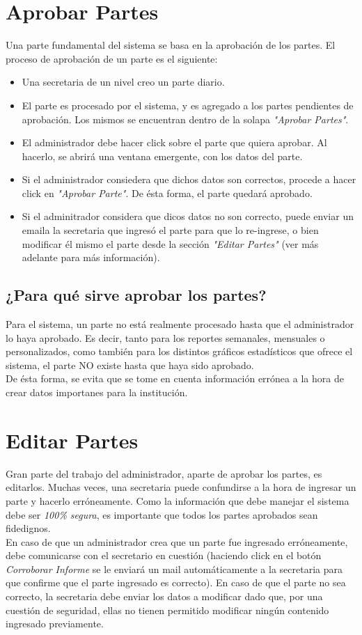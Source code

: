 \documentclass[12pt,a4paper]{article}
\begin{document}
\section{Aprobar Partes}
Una parte fundamental del sistema se basa en la aprobación de los partes. El proceso de aprobación de un parte es el siguiente:
\begin{itemize}
	\item Una secretaria de un nivel creo un parte diario.
	\item El parte es procesado por el sistema, y es agregado a los partes pendientes de aprobación. Los mismos se encuentran dentro de la solapa \textit{"Aprobar Partes"}. 
	\item El administrador debe hacer click sobre el parte que quiera aprobar. Al hacerlo, se abrirá una ventana emergente, con los datos del parte.
	\item Si el administrador consiedera que dichos datos son correctos, procede a hacer click en \textit{"Aprobar Parte"}. De ésta forma, el parte quedará aprobado.
	\item Si el adminitrador considera que dicos datos no son correcto, puede enviar un emaila la secretaria que ingresó el parte para que lo re-ingrese, o bien modificar él mismo el parte desde la sección \textit{"Editar Partes"} (ver más adelante para más información).
\end{itemize}

\subsection{¿Para qué sirve aprobar los partes?}
Para el sistema, un parte no está realmente procesado hasta que el administrador lo haya aprobado. Es decir, tanto para los reportes semanales, mensuales o personalizados, como también para los distintos gráficos estadísticos que ofrece el sistema, el parte NO existe hasta que haya sido aprobado. \\De ésta forma, se evita que se tome en cuenta información errónea a la hora de crear datos importanes para la institución.



\section{Editar Partes}
Gran parte del trabajo del administrador, aparte de aprobar los partes, es editarlos. Muchas veces, una secretaria puede confundirse a la hora de ingresar un parte y hacerlo erróneamente. Como la información que debe manejar el sistema debe ser \textit{100\% segura}, es importante que todos los partes aprobados sean fidedignos. \\ 
En caso de que un administrador crea que un parte fue ingresado erróneamente, debe comunicarse con el secretario en cuestión (haciendo click en el botón \textit{Corroborar Informe} se le enviará un mail automáticamente a la secretaria para que confirme que el parte ingresado es correcto). En caso de que el parte no sea correcto, la secretaria debe enviar los datos a modificar dado que, por una cuestión de seguridad, ellas no tienen permitido modificar ningún contenido ingresado previamente.
\end{document}
